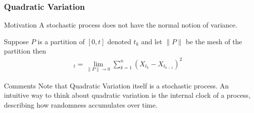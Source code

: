 \documentclass[10pt]{beamer}
\begin{document}
\begin{frame}
  \frametitle{Quadratic Variation}
  \begin{block}{Motivation}
    A stochastic process does not have the normal notion of variance.
  \end{block}
  \begin{definition}
    Suppose $P$ is a partition of $[0,t]$ denoted $t_k$ and let $\lVert P \rVert$ be the mesh of the partition then
        \begin{align*}
          [X]_t = \lim\limits_{\lVert P \rVert \to 0} \displaystyle\sum_{k = 1}^{n}(X_{t_k} - X_{t_{k-1}})^2
        \end{align*}
  \end{definition}
  \begin{block}{Comments}
    Note that Quadratic Variation itself is a stochastic process. An intuitive way to think about quadratic variation is the internal clock of a process, describing how randomness accumulates over time.
  \end{block}
\end{frame}
\end{document}

